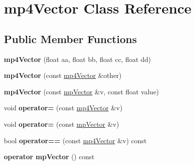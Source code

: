 \hypertarget{classmp4_vector}{}\section{mp4\+Vector Class Reference}
\label{classmp4_vector}
\subsection*{Public Member Functions}
\begin{DoxyCompactItemize}
\item 
\mbox{\label{classmp4_vector_aedb4a7c7bb693d53c197df236fd1c355}} 
{\bfseries mp4\+Vector} (float aa, float bb, float cc, float dd)
\item 
\mbox{\label{classmp4_vector_aab94f27ef5cbd07eae82efb1bb769316}} 
{\bfseries mp4\+Vector} (const \mbox{\hyperlink{classmp4_vector}{mp4\+Vector}} \&other)
\item 
\mbox{\label{classmp4_vector_a2f48ac397f4cd26132c3a7a871b45f19}} 
{\bfseries mp4\+Vector} (const \mbox{\hyperlink{classmp_vector}{mp\+Vector}} \&v, const float value)
\item 
\mbox{\label{classmp4_vector_a8f998271d5330972ec3561a77dd87b27}} 
void {\bfseries operator=} (const \mbox{\hyperlink{classmp4_vector}{mp4\+Vector}} \&v)
\item 
\mbox{\label{classmp4_vector_a2ef6ae558f834f8fe36b4930ac103407}} 
void {\bfseries operator=} (const \mbox{\hyperlink{classmp_vector}{mp\+Vector}} \&v)
\item 
\mbox{\label{classmp4_vector_af2fe1a7ce2a033b3933a6bd61d280887}} 
bool {\bfseries operator==} (const \mbox{\hyperlink{classmp4_vector}{mp4\+Vector}} \&v) const
\item 
\mbox{\label{classmp4_vector_ad3bc1a5bb2f32ffa4162bb544090b6dd}} 
{\bfseries operator mp\+Vector} () const
\end{DoxyCompactItemize}
